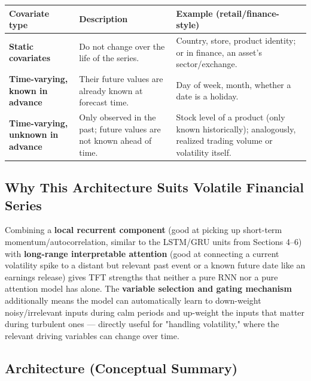 \documentclass[12pt,openany]{book}
\theoremstyle{definition}
\theoremstyle{remark}
\begin{document}
{\small
\begin{longtable}{@{}L{0.20\textwidth}L{0.34\textwidth}L{0.38\textwidth}@{}}
\toprule
Covariate type & Description & Example (retail/finance-style) \\
\midrule
\textbf{Static covariates} & Do not change over the life of the series. & Country, store, product identity; or in finance, an asset's sector/exchange. \\
\textbf{Time-varying, known in advance} & Their future values are already known at forecast time. & Day of week, month, whether a date is a holiday. \\
\textbf{Time-varying, unknown in advance} & Only observed in the past; future values are not known ahead of time. & Stock level of a product (only known historically); analogously, realized trading volume or volatility itself. \\
\bottomrule
\end{longtable}
}

\subsection{Why This Architecture Suits Volatile Financial Series}

Combining a \textbf{local recurrent component} (good at picking up short-term momentum/autocorrelation, similar to the LSTM/GRU units from Sections 4--6) with \textbf{long-range interpretable attention} (good at connecting a current volatility spike to a distant but relevant past event or a known future date like an earnings release) gives TFT strengths that neither a pure RNN nor a pure attention model has alone. The \textbf{variable selection and gating mechanism} additionally means the model can automatically learn to down-weight noisy/irrelevant inputs during calm periods and up-weight the inputs that matter during turbulent ones --- directly useful for "handling volatility," where the relevant driving variables can change over time.

\subsection{Architecture (Conceptual Summary)}
\end{document}
